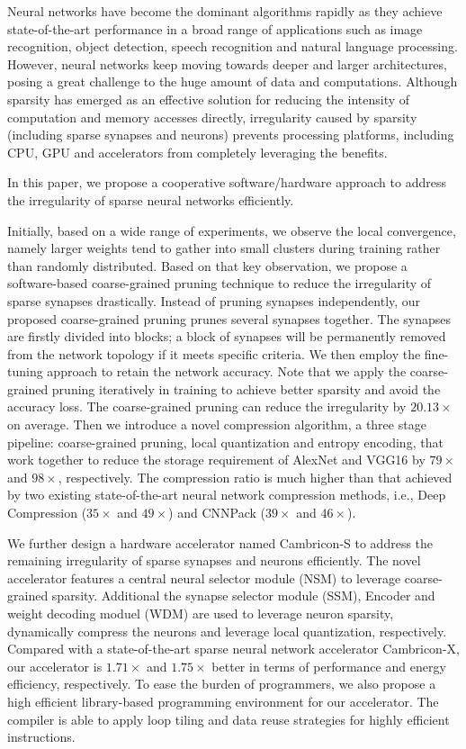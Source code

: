 \begin{enabstract}
Neural networks have become the dominant algorithms rapidly as they achieve state-of-the-art performance in a broad range of applications such as image recognition, object detection, speech recognition and natural language processing. However, neural networks keep moving towards deeper and larger architectures, posing a great challenge to the huge amount of data and computations. Although sparsity has emerged as an effective solution for reducing the intensity of computation and memory accesses directly, irregularity caused by sparsity (including sparse synapses and neurons) prevents processing platforms, including CPU, GPU and accelerators from completely leveraging the benefits. 

In this paper, we propose a cooperative software/hardware approach to address the irregularity of sparse neural networks efficiently. 

Initially, based on a wide range of experiments, we observe the local convergence, namely larger weights tend to gather into small clusters during training rather than randomly distributed. Based on that key observation, we propose a software-based coarse-grained pruning technique to reduce the irregularity of sparse synapses drastically. Instead of pruning synapses independently, our proposed coarse-grained pruning prunes several synapses together. The synapses are firstly divided into blocks; a block of synapses will be permanently removed from the network topology if it meets specific criteria. We then employ the fine-tuning approach to retain the network accuracy. Note that we apply the coarse-grained pruning iteratively in training to achieve better sparsity and avoid the accuracy loss. The coarse-grained pruning can reduce the irregularity by $20.13\times$ on average. Then we introduce a novel compression algorithm, a three stage pipeline: coarse-grained pruning, local quantization and entropy encoding, that work together to reduce the storage requirement of AlexNet and VGG16 by $79\times$ and $98\times$, respectively. The compression ratio is much higher than that achieved by two existing state-of-the-art neural network compression methods, i.e., Deep Compression ($35\times$ and $49\times$) and CNNPack ($39\times$ and $46\times$).

We further design a hardware accelerator named Cambricon-S to address the remaining irregularity of sparse synapses and neurons efficiently. The novel accelerator features a central neural selector module (NSM) to leverage coarse-grained sparsity. Additional the synapse selector module (SSM), Encoder and weight decoding moduel (WDM) are used to leverage neuron sparsity, dynamically compress the neurons and leverage local quantization, respectively. Compared with a state-of-the-art sparse neural network accelerator Cambricon-X, our accelerator is $1.71\times$ and $1.75\times$ better in terms of performance and energy efficiency, respectively. To ease the burden of programmers, we also propose a high efficient library-based programming environment for our accelerator. The compiler is able to apply loop tiling and data reuse strategies for highly efficient instructions. 

\end{enabstract}
